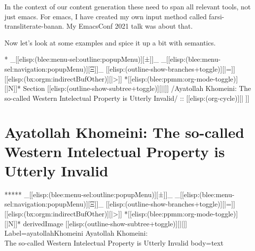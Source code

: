 \begin{whenOrg}
\begin{verblatex}
\begin{frame}[fragile,plain,label=persoArabic]
{  In the context of our content generation these need to span all relevant tools, not just emacs.
  For emacs, I have created my own input method called farsi-transliterate-banan. My EmacsConf 2021 talk was about that.

  Now let's look at some examples and spice it up a bit with semantics.

}

\end{frame}
\end{verblatex}


\begin{whenOrg}
*  _[[elisp:(blee:menu-sel:outline:popupMenu)][±]]_ _[[elisp:(blee:menu-sel:navigation:popupMenu)][Ξ]]_ [[elisp:(outline-show-branches+toggle)][|=]] [[elisp:(bx:orgm:indirectBufOther)][|>]] *[[elisp:(blee:ppmm:org-mode-toggle)][|N]]*  Section    [[elisp:(outline-show-subtree+toggle)][||]]   /Ayatollah Khomeini: The so-called Western Intelectual Property is Utterly Invalid/ ::  [[elisp:(org-cycle)][| ]]
\end{whenOrg}

\section{Ayatollah Khomeini: The so-called Western Intelectual Property is Utterly Invalid}


\begin{whenOrg}
*****  _[[elisp:(blee:menu-sel:outline:popupMenu)][±]]_ _[[elisp:(blee:menu-sel:navigation:popupMenu)][Ξ]]_ [[elisp:(outline-show-branches+toggle)][|=]] [[elisp:(bx:orgm:indirectBufOther)][|>]] *[[elisp:(blee:ppmm:org-mode-toggle)][|N]]*  derivedImage [[elisp:(outline-show-subtree+toggle)][||]] Label=ayatollahKhomeini Ayatollah Khomeini:\\ The so-called Western Intelectual Property is Utterly Invalid body=text
\end{whenOrg}

\begin{htmlonly}


\end{htmlonly}
\end{whenOrg}
